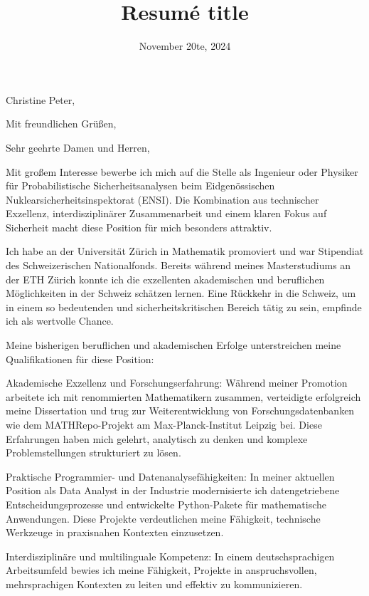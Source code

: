 \documentclass[11pt,a4paper,sans]{moderncv}
\title{Resumé title}
\begin{document}
\date{November 20te, 2024}
\opening{Christine Peter,}
\closing{
Mit freundlichen Grüßen,}

\makelettertitle

\justify

Sehr geehrte Damen und Herren,

Mit großem Interesse bewerbe ich mich auf die Stelle als Ingenieur oder Physiker für Probabilistische Sicherheitsanalysen beim Eidgenössischen Nuklearsicherheitsinspektorat (ENSI). Die Kombination aus technischer Exzellenz, interdisziplinärer Zusammenarbeit und einem klaren Fokus auf Sicherheit macht diese Position für mich besonders attraktiv.

Ich habe an der Universität Zürich in Mathematik promoviert und war Stipendiat des Schweizerischen Nationalfonds. Bereits während meines Masterstudiums an der ETH Zürich konnte ich die exzellenten akademischen und beruflichen Möglichkeiten in der Schweiz schätzen lernen. Eine Rückkehr in die Schweiz, um in einem so bedeutenden und sicherheitskritischen Bereich tätig zu sein, empfinde ich als wertvolle Chance.

Meine bisherigen beruflichen und akademischen Erfolge unterstreichen meine Qualifikationen für diese Position:

    Akademische Exzellenz und Forschungserfahrung: Während meiner Promotion arbeitete ich mit renommierten Mathematikern zusammen, verteidigte erfolgreich meine Dissertation und trug zur Weiterentwicklung von Forschungsdatenbanken wie dem MATHRepo-Projekt am Max-Planck-Institut Leipzig bei. Diese Erfahrungen haben mich gelehrt, analytisch zu denken und komplexe Problemstellungen strukturiert zu lösen.

    Praktische Programmier- und Datenanalysefähigkeiten: In meiner aktuellen Position als Data Analyst in der Industrie modernisierte ich datengetriebene Entscheidungsprozesse und entwickelte Python-Pakete für mathematische Anwendungen. Diese Projekte verdeutlichen meine Fähigkeit, technische Werkzeuge in praxisnahen Kontexten einzusetzen.

    Interdisziplinäre und multilinguale Kompetenz: In einem deutschsprachigen Arbeitsumfeld bewies ich meine Fähigkeit, Projekte in anspruchsvollen, mehrsprachigen Kontexten zu leiten und effektiv zu kommunizieren.
\end{document}
